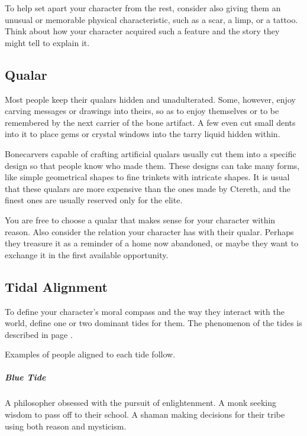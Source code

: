    To help set apart your character from the rest, consider also giving them an unusual or memorable physical characteristic, such as a scar, a limp, or a tattoo.
    Think about how your character acquired such a feature and the story they might tell to explain it.

\subsection*{Qualar}
    Most people keep their qualars hidden and unadulterated.
    Some, however, enjoy carving messages or drawings into theirs, so as to enjoy themselves or to be remembered by the next carrier of the bone artifact.
    A few even cut small dents into it to place gems or crystal windows into the tarry liquid hidden within.

    Bonecarvers capable of crafting artificial qualars usually cut them into a specific design so that people know who made them.
    These designs can take many forms, like simple geometrical shapes to fine trinkets with intricate shapes.
    It is usual that these qualars are more expensive than the ones made by Ctereth, and the finest ones are usually reserved only for the elite.

    You are free to choose a qualar that makes sense for your character within reason.
    Also consider the relation your character has with their qualar.
    Perhaps they treasure it as a reminder of a home now abandoned, or maybe they want to exchange it in the first available opportunity.

%
%

\subsection*{Tidal Alignment}
    To define your character's moral compass and the way they interact with the world, define one or two dominant tides for them.
    The phenomenon of the tides is described in page \pageref{ssec::tides}.

    Examples of people aligned to each tide follow.

    \subparagraph{Blue Tide} A philosopher obsessed with the pursuit of enlightenment.
        A monk seeking wisdom to pass off to their school.
        A shaman making decisions for their tribe using both reason and mysticism.


